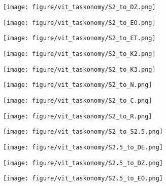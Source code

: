\begin{figure}[h]
\begin{subfigure}{\figlength\textwidth}
\texttt{[image: figure/vit\_taskonomy/S2\_to\_DZ.png]}
\end{subfigure}
\begin{subfigure}{\figlength\textwidth}
\texttt{[image: figure/vit\_taskonomy/S2\_to\_EO.png]}
\end{subfigure}
\begin{subfigure}{\figlength\textwidth}
\texttt{[image: figure/vit\_taskonomy/S2\_to\_ET.png]}
\end{subfigure}
\begin{subfigure}{\figlength\textwidth}
\texttt{[image: figure/vit\_taskonomy/S2\_to\_K2.png]}
\end{subfigure}
\begin{subfigure}{\figlength\textwidth}
\texttt{[image: figure/vit\_taskonomy/S2\_to\_K3.png]}
\end{subfigure}
\begin{subfigure}{\figlength\textwidth}
\texttt{[image: figure/vit\_taskonomy/S2\_to\_N.png]}
\end{subfigure}
\begin{subfigure}{\figlength\textwidth}
\texttt{[image: figure/vit\_taskonomy/S2\_to\_C.png]}
\end{subfigure}
\begin{subfigure}{\figlength\textwidth}
\texttt{[image: figure/vit\_taskonomy/S2\_to\_R.png]}
\end{subfigure}
\begin{subfigure}{\figlength\textwidth}
\texttt{[image: figure/vit\_taskonomy/S2\_to\_S2.5.png]}
\end{subfigure}
\begin{subfigure}{\figlength\textwidth}
\texttt{[image: figure/vit\_taskonomy/S2.5\_to\_DE.png]}
\end{subfigure}
\begin{subfigure}{\figlength\textwidth}
\texttt{[image: figure/vit\_taskonomy/S2.5\_to\_DZ.png]}
\end{subfigure}
\begin{subfigure}{\figlength\textwidth}
\texttt{[image: figure/vit\_taskonomy/S2.5\_to\_EO.png]}
\end{subfigure}
\begin{subfigure}{\figlength\textwidth}

\end{subfigure}
\end{figure}
